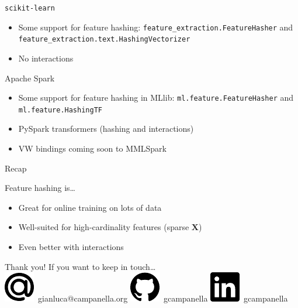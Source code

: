 \documentclass[12pt,aspectratio=169]{beamer}
\renewcommand{\vec}[1]{\ensuremath{\mathbf{#1}}}
\newcommand{\mat}[1]{\ensuremath{\vec{#1}}}
\begin{document}
\begin{frame}{\texttt{scikit-learn}}
    \begin{itemize}
        \setlength\itemsep{\bigskipamount}
        \item Some support for feature hashing:
              \texttt{feature\_extraction.FeatureHasher} and
              \texttt{feature\_extraction.text.HashingVectorizer}
        \item No interactions
    \end{itemize}
\end{frame}

\begin{frame}{Apache Spark}
    \begin{itemize}
        \setlength\itemsep{\bigskipamount}
        \item Some support for feature hashing in MLlib:
              \texttt{ml.feature.FeatureHasher} and
              \texttt{ml.feature.HashingTF}
        \item PySpark transformers (hashing and interactions)
        \item VW bindings coming soon to MMLSpark
    \end{itemize}
\end{frame}

\begin{frame}{Recap}
    \begin{block}{Feature hashing is\ldots}
        \begin{itemize}
            \item Great for online training on lots of data
            \item Well\hyp{}suited for high\hyp{}cardinality features
                  (sparse $\mat{X}$)
            \item Even better with interactions
        \end{itemize}
    \end{block}
\end{frame}

\begin{frame}
    \begin{center}
        {\LARGE%
         Thank you!}
        \vfill
        If you want to keep in touch\ldots \\[\medskipamount]
        \includegraphics[height=1ex]{figures/mail}~gianluca@campanella.org
        \hspace{1em}
        \includegraphics[height=1ex]{figures/github}~gcampanella
        \hspace{1em}
        \includegraphics[height=1ex]{figures/linkedin}~gcampanella
    \end{center}
\end{frame}
\end{document}
